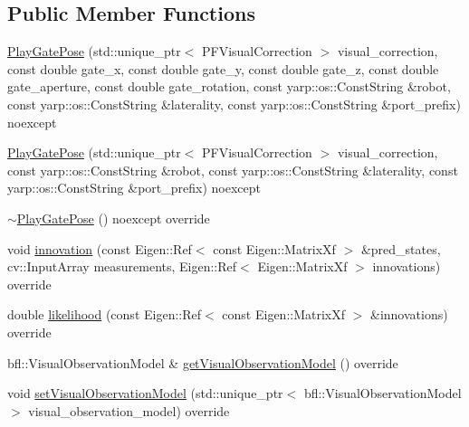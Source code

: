\subsection*{Public Member Functions}
\begin{DoxyCompactItemize}
\item 
\hyperlink{classPlayGatePose_a134d268932fcced2e6d6cc1a800cf7e9}{Play\+Gate\+Pose} (std\+::unique\+\_\+ptr$<$ P\+F\+Visual\+Correction $>$ visual\+\_\+correction, const double gate\+\_\+x, const double gate\+\_\+y, const double gate\+\_\+z, const double gate\+\_\+aperture, const double gate\+\_\+rotation, const yarp\+::os\+::\+Const\+String \&robot, const yarp\+::os\+::\+Const\+String \&laterality, const yarp\+::os\+::\+Const\+String \&port\+\_\+prefix) noexcept
\item 
\hyperlink{classPlayGatePose_a8fdd90dc3b3f2b4c2f93e31d11aaabce}{Play\+Gate\+Pose} (std\+::unique\+\_\+ptr$<$ P\+F\+Visual\+Correction $>$ visual\+\_\+correction, const yarp\+::os\+::\+Const\+String \&robot, const yarp\+::os\+::\+Const\+String \&laterality, const yarp\+::os\+::\+Const\+String \&port\+\_\+prefix) noexcept
\item 
\hyperlink{classPlayGatePose_a06fd05c14cdfc88a04a7d860c7c66bf6}{$\sim$\+Play\+Gate\+Pose} () noexcept override
\item 
void \hyperlink{classGatePose_a00607a4325dcfb7a02bda7490b65d25c}{innovation} (const Eigen\+::\+Ref$<$ const Eigen\+::\+Matrix\+Xf $>$ \&pred\+\_\+states, cv\+::\+Input\+Array measurements, Eigen\+::\+Ref$<$ Eigen\+::\+Matrix\+Xf $>$ innovations) override
\item 
double \hyperlink{classGatePose_a939c575d5d59c8b0f3ab528edd368c0d}{likelihood} (const Eigen\+::\+Ref$<$ const Eigen\+::\+Matrix\+Xf $>$ \&innovations) override
\item 
bfl\+::\+Visual\+Observation\+Model \& \hyperlink{classGatePose_aa47f9242f039b8752675db5594350a28}{get\+Visual\+Observation\+Model} () override
\item 
void \hyperlink{classGatePose_a18ba358c801ae1a246dbee2f9780c698}{set\+Visual\+Observation\+Model} (std\+::unique\+\_\+ptr$<$ bfl\+::\+Visual\+Observation\+Model $>$ visual\+\_\+observation\+\_\+model) override
\end{DoxyCompactItemize}
